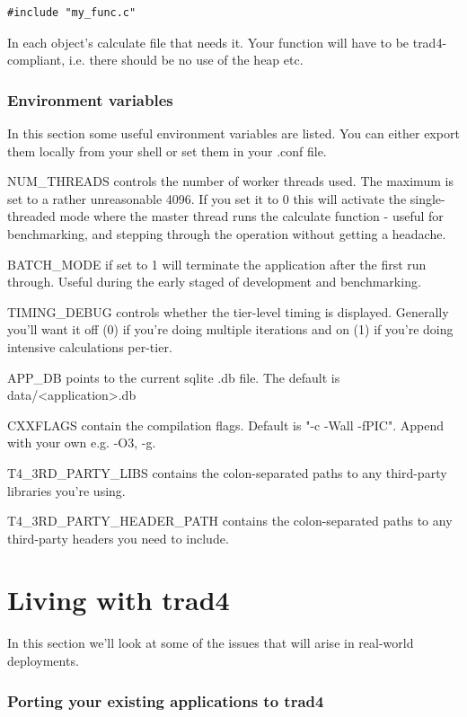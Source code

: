 \documentclass{report}
\begin{document}
\begin{verbatim}
#include "my_func.c"
\end{verbatim}

In each object's calculate file that needs it. Your function will have to be trad4-compliant, i.e. there should be no use of the heap etc. 

\subsection{Environment variables}
In this section some useful environment variables are listed. You can either export them locally from your shell or set them in your .conf file.

NUM_THREADS controls the number of worker threads used. The maximum is set to a rather unreasonable 4096. If you set it to 0 this will activate the single-threaded mode where the master thread runs the calculate function - useful for benchmarking, and stepping through the operation without getting a headache.

BATCH_MODE if set to 1 will terminate the application after the first run through. Useful during the early staged of development and benchmarking.

TIMING_DEBUG controls whether the tier-level timing is displayed. Generally you'll want it off  (0) if you're doing multiple iterations and on (1) if you're doing intensive calculations per-tier.

APP_DB points to the current sqlite .db file. The default is data/<application>.db

CXXFLAGS contain the compilation flags. Default is "-c -Wall -fPIC". Append with your own e.g.  -O3, -g.

T4_3RD_PARTY_LIBS contains the colon-separated paths to any third-party libraries you're using.

T4_3RD_PARTY_HEADER_PATH contains the colon-separated paths to any third-party headers you need to include.

\chapter{Living with trad4}

In this section we'll look at some of the issues that will arise in real-world deployments.

\subsection{Porting your existing applications to trad4}
\end{document}
